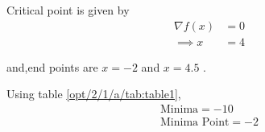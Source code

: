 \begin{enumerate}
    Critical point is given by
    \begin{align}
        \nabla f(x) &= 0 \\
        \implies x &= 4
    \end{align}
    
    and,end points are $x=-2$ and $x=4.5$ .
    
    Using table \ref{opt/2/1/a/tab:table1},
    \begin{align}
        \boxed{\text{Minima} = -10}\\
        \boxed{\text{Minima Point} = -2}
    \end{align}
    
\end{enumerate}



